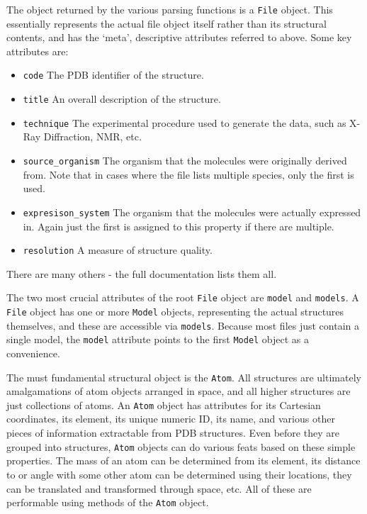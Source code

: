The object returned by the various parsing functions is a \texttt{File} object. This essentially represents the actual file object itself rather than its structural contents, and has the `meta', descriptive attributes referred to above. Some key attributes are:

\begin{itemize}
  \item \texttt{code} The PDB identifier of the structure.
  \item \texttt{title} An overall description of the structure.
  \item \texttt{technique} The experimental procedure used to generate the data, such as X-Ray Diffraction, NMR, etc.
  \item \texttt{source\_organism} The organism that the molecules were originally derived from. Note that in cases where the file lists multiple species, only the first is used.
  \item \texttt{expresison\_system} The organism that the molecules were actually expressed in. Again just the first is assigned to this property if there are multiple.
  \item \texttt{resolution} A measure of structure quality.
\end{itemize}

There are many others - the full documentation lists them all.

The two most crucial attributes of the root \texttt{File} object are \texttt{model} and \texttt{models}. A \texttt{File} object has one or more \texttt{Model} objects, representing the actual structures themselves, and these are accessible via \texttt{models}. Because most files just contain a single model, the \texttt{model} attribute points to the first \texttt{Model} object as a convenience.

The must fundamental structural object is the \texttt{Atom}. All structures are ultimately amalgamations of atom objects arranged in space, and all higher structures are just collections of atoms. An \texttt{Atom} object has attributes for its Cartesian coordinates, its element, its unique numeric ID, its name, and various other pieces of information extractable from PDB structures. Even before they are grouped into structures, \texttt{Atom} objects can do various feats based on these simple properties. The mass of an atom can be determined from its element, its distance to or angle with some other atom can be determined using their locations, they can be translated and transformed through space, etc. All of these are performable using methods of the \texttt{Atom} object.

